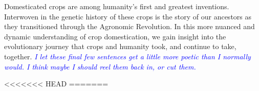 \documentclass[11pt]{article}
\newcommand{\gmj}[1]{\textcolor{blue}{ \emph{\scriptsize  #1}} } %
\begin{document}
Domesticated crops are among humanity's first and greatest inventions.
Interwoven in the genetic history of these crops is the story of our ancestors as they transitioned through the Agronomic Revolution.
In this more nuanced and dynamic understanding of crop domestication, we gain insight into the evolutionary journey that crops and humanity took, and continue to take, together.
\gmj{I let these final few sentences get a little more poetic than I normally would.  I think maybe I should reel them back in, or cut them.}


<<<<<<< HEAD
=======














\end{document}
